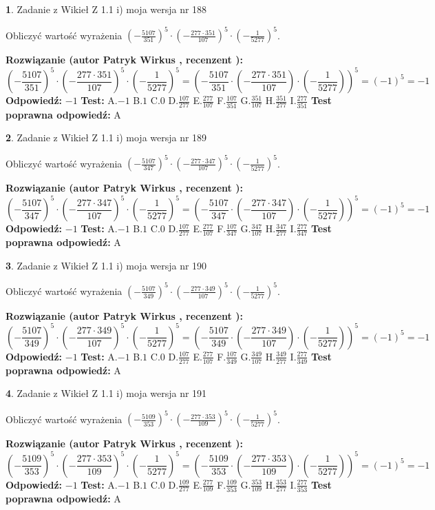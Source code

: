 \documentclass[12pt, a4paper]{article}
\theoremstyle{definition} %
\newtheorem{zad}{}
\newcommand{\zadStart}[1]{\begin{zad}#1\newline}
\newcommand{\zadStop}{\end{zad}}
\newcommand{\rozwStart}[2]{\noindent \textbf{Rozwiązanie (autor #1 , recenzent #2): }\newline}
\newcommand{\rozwStop}{\newline}
\newcommand{\odpStart}{\noindent \textbf{Odpowiedź:}\newline}
\newcommand{\odpStop}{\newline}
\newcommand{\testStart}{\noindent \textbf{Test:}\newline}
\newcommand{\testStop}{\newline}
\newcommand{\kluczStart}{\noindent \textbf{Test poprawna odpowiedź:}\newline}
\newcommand{\kluczStop}{\newline}
\begin{document}
\zadStart{Zadanie z Wikieł Z 1.1 i) moja wersja nr 188}

Obliczyć wartość wyrażenia $(-\frac{5107}{351})^{5} \cdot (-\frac{277 \cdot 351}{107})^{5} \cdot (-\frac{1}{5277})^{5}$.
\zadStop
\rozwStart{Patryk Wirkus}{}
$$(-\frac{5107}{351})^{5} \cdot (-\frac{277 \cdot 351}{107})^{5} \cdot (-\frac{1}{5277})^{5} = (-\frac{5107}{351} \cdot (-\frac{277 \cdot 351}{107}) \cdot (-\frac{1}{5277}))^{5} = (-1)^{5} = -1$$
\rozwStop
\odpStart
$-1$
\odpStop
\testStart
A.$-1$ B.$1$ C.$0$ D.$\frac{107}{277}$ E.$\frac{277}{107}$
F.$\frac{107}{351}$ G.$\frac{351}{107}$
H.$\frac{351}{277}$
I.$\frac{277}{351}$
\testStop
\kluczStart
A
\kluczStop



\zadStart{Zadanie z Wikieł Z 1.1 i) moja wersja nr 189}

Obliczyć wartość wyrażenia $(-\frac{5107}{347})^{5} \cdot (-\frac{277 \cdot 347}{107})^{5} \cdot (-\frac{1}{5277})^{5}$.
\zadStop
\rozwStart{Patryk Wirkus}{}
$$(-\frac{5107}{347})^{5} \cdot (-\frac{277 \cdot 347}{107})^{5} \cdot (-\frac{1}{5277})^{5} = (-\frac{5107}{347} \cdot (-\frac{277 \cdot 347}{107}) \cdot (-\frac{1}{5277}))^{5} = (-1)^{5} = -1$$
\rozwStop
\odpStart
$-1$
\odpStop
\testStart
A.$-1$ B.$1$ C.$0$ D.$\frac{107}{277}$ E.$\frac{277}{107}$
F.$\frac{107}{347}$ G.$\frac{347}{107}$
H.$\frac{347}{277}$
I.$\frac{277}{347}$
\testStop
\kluczStart
A
\kluczStop



\zadStart{Zadanie z Wikieł Z 1.1 i) moja wersja nr 190}

Obliczyć wartość wyrażenia $(-\frac{5107}{349})^{5} \cdot (-\frac{277 \cdot 349}{107})^{5} \cdot (-\frac{1}{5277})^{5}$.
\zadStop
\rozwStart{Patryk Wirkus}{}
$$(-\frac{5107}{349})^{5} \cdot (-\frac{277 \cdot 349}{107})^{5} \cdot (-\frac{1}{5277})^{5} = (-\frac{5107}{349} \cdot (-\frac{277 \cdot 349}{107}) \cdot (-\frac{1}{5277}))^{5} = (-1)^{5} = -1$$
\rozwStop
\odpStart
$-1$
\odpStop
\testStart
A.$-1$ B.$1$ C.$0$ D.$\frac{107}{277}$ E.$\frac{277}{107}$
F.$\frac{107}{349}$ G.$\frac{349}{107}$
H.$\frac{349}{277}$
I.$\frac{277}{349}$
\testStop
\kluczStart
A
\kluczStop



\zadStart{Zadanie z Wikieł Z 1.1 i) moja wersja nr 191}

Obliczyć wartość wyrażenia $(-\frac{5109}{353})^{5} \cdot (-\frac{277 \cdot 353}{109})^{5} \cdot (-\frac{1}{5277})^{5}$.
\zadStop
\rozwStart{Patryk Wirkus}{}
$$(-\frac{5109}{353})^{5} \cdot (-\frac{277 \cdot 353}{109})^{5} \cdot (-\frac{1}{5277})^{5} = (-\frac{5109}{353} \cdot (-\frac{277 \cdot 353}{109}) \cdot (-\frac{1}{5277}))^{5} = (-1)^{5} = -1$$
\rozwStop
\odpStart
$-1$
\odpStop
\testStart
A.$-1$ B.$1$ C.$0$ D.$\frac{109}{277}$ E.$\frac{277}{109}$
F.$\frac{109}{353}$ G.$\frac{353}{109}$
H.$\frac{353}{277}$
I.$\frac{277}{353}$
\testStop
\kluczStart
A
\kluczStop
\end{document}
